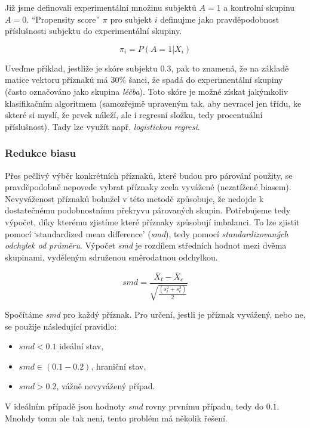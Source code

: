 Již jsme definovali experimentální množinu subjektů \( A = 1 \) a kontrolní skupinu \( A = 0 \).
\enquote{Propensity score} \( \pi \) pro subjekt \( i \) definujme jako pravděpodobnost příslušnosti subjektu do experimentální skupiny.

\[ \pi_i = P(A = 1 | X_i) \]

Uveďme příklad, jestliže je skóre subjektu \( 0.3 \), pak to znamená, že na základě matice vektoru příznaků má \( 30\% \) šanci, že spadá do experimentální skupiny (často označováno jako skupina \textit{léčba}).
Toto skóre je možné získat jakýmkoliv klasifikačním algoritmem (samozřejmě upraveným tak, aby nevracel jen třídu, ke skteré si myslí, že prvek náleží, ale i regresní složku, tedy procentuální příslušnost).
Tady lze využít např. \textit{logistickou regresi}.

\subsubsection{Redukce biasu}

Přes pečlivý výběr konkrétních příznaků, které budou pro párování použity, se pravděpodobně nepovede vybrat příznaky zcela vyvážené (nezatížené biasem).
Nevyváženost příznaků bohužel v této metodě způsobuje, že nedojde k dostatečnému podobnostnímu překryvu párovaných skupin.
Potřebujeme tedy výpočet, díky kterému zjistíme které příznaky způsobují imbalanci.
To lze zjistit pomocí \enquote*{standardized mean difference} (\textit{smd}), tedy pomocí \textit{standardizovaných odchylek od průměru}.
Výpočet \textit{smd} je rozdílem středních hodnot mezi dvěma skupinami, vyděleným sdruženou směrodatnou odchylkou.

\[ smd = \frac{\bar{X}_t - \bar{X}_c}{ \sqrt{\frac{(s^2_t + s^2_c)}{2} }} \]

Spočítáme \textit{smd} pro každý příznak.
Pro určení, jestli je příznak vyvážený, nebo ne, se použije následující pravidlo:

\begin{itemize}
	\item \( smd < 0.1 \) ideální stav,
	\item \( smd \in (0.1-0.2) \), hraniční stav,
	\item \( smd > 0.2 \), vážně nevyvážený případ.
\end{itemize}

V ideálním případě jsou hodnoty \textit{smd} rovny prvnímu případu, tedy do \( 0.1 \).
Mnohdy tomu ale tak není, tento problém má několik řešení.

